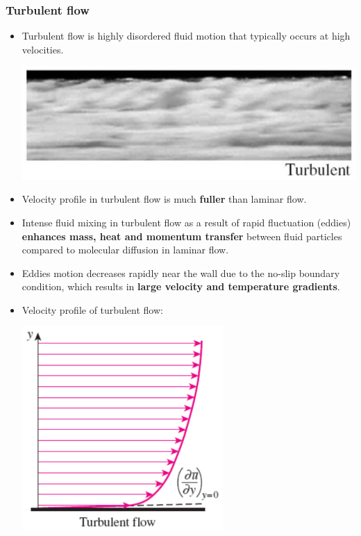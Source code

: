 \documentclass[11pt]{article}
\begin{document}
\subsubsection{Turbulent flow}
\label{sec:orgccd704e}
\begin{itemize}
\item Turbulent flow is highly disordered fluid motion that typically occurs at high velocities.
\begin{center}
\includegraphics[width=.9\linewidth]{./images/turbulent-flow-photo.png}
\end{center}
\item Velocity profile in turbulent flow is much \textbf{fuller} than laminar flow.
\item Intense fluid mixing in turbulent flow as a result of rapid fluctuation (eddies) \textbf{enhances mass, heat and momentum transfer} between fluid particles compared to molecular diffusion in laminar flow.
\item Eddies motion decreases rapidly near the wall due to the no-slip boundary condition, which results in \textbf{large velocity and temperature gradients}.
\item Velocity profile of turbulent flow:
\begin{center}
\includegraphics[height=21em]{./images/turbulent-flow-graph.png}
\end{center}
\end{itemize}
\end{document}
